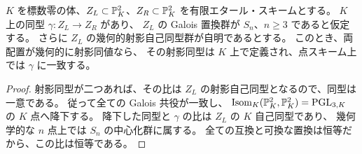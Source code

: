 \begin{lemma}[一意な射影同型の降下]\label{lem:projectivity-descent-v23}
$K$ を標数零の体、$Z_L\subset\mathbb P^2_K$、$Z_R\subset\mathbb P^2_K$ を有限エタール・スキームとする。
$K$ 上の同型 $\gamma:Z_L\to Z_R$ があり、
$Z_L$ の Galois 置換群が $S_n$、$n\ge3$ であると仮定する。
さらに $Z_L$ の幾何的射影自己同型群が自明であるとする。
このとき、両配置が幾何的に射影同値なら、
その射影同型は $K$ 上で定義され、点スキーム上では $\gamma$ に一致する。
\end{lemma}
\begin{proof}
射影同型が二つあれば、その比は $Z_L$ の射影自己同型となるので、同型は一意である。
従って全ての Galois 共役が一致し、
$\operatorname{Isom}_K(\mathbb P^2_K,\mathbb P^2_K)=\operatorname{PGL}_{3,K}$ の $K$ 点へ降下する。
降下した同型と $\gamma$ の比は $Z_L$ の $K$ 自己同型であり、
幾何学的な $n$ 点上では $S_n$ の中心化群に属する。
全ての互換と可換な置換は恒等だから、この比は恒等である。
\end{proof}

